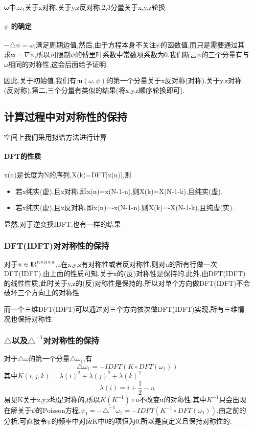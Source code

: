 \documentclass[UTF8]{ctexart}
\begin{document}
$\mathbf{\omega}$中,$\omega_1$关于x对称,关于y,z反对称,2,3分量关于x,y,z轮换

\paragraph{$\psi$ 的确定}
$-\triangle \psi = \omega$,满足周期边值,然后,由于方程本身不关注$\psi$的函数值,而只是需要通过其求$\mathbf{u}=\nabla \psi$,所以可限制$\psi$的傅里叶系数中常数项系数为0.我们断言$\psi$的三个分量有与$\omega$相同的对称性,这会后面给予证明.


因此,关于初始值,我们有:$\mathbf{u}(\omega,\psi)$的第一个分量关于x反对称(对称),关于y,z对称(反对称),第二,三个分量有类似的结果(将x,y,z顺序轮换即可).


\subsection{计算过程中对对称性的保持}
空间上我们采用拟谱方法进行计算
\paragraph{DFT的性质}
x(n)是长度为N的序列,X(k)=DFT[x(n)],则
\begin{itemize}
  \item 若x纯实(虚),且x对称,即x(n)=x(N-1-n),则X(k)=X(N-1-k),且纯实(虚).
  \item 若x纯实(虚),且x反对称,即x(n)=-x(N-1-n),则X(k)=-X(N-1-k),且纯虚(实).
\end{itemize}
显然,对于逆变换IDFT,也有一样的结果

\subsubsection{DFT(IDFT)对对称性的保持}
对于$u\in \rm{I\!R}^{n \times n \times n}$,u在x,y,z有对称性或者反对称性,则对u的所有行做一次DFT(IDFT),由上面的性质可知,关于x的(反)对称性是保持的,此外,由DFT(IDFT)的线性性质,此时关于y,z的(反)对称性是保持的.所以对单个方向做DFT(IDFT)不会破坏三个方向上的对称性

而一个三维DFT(IDFT)可以通过对三个方向依次做DFT(IDFT)实现,所有三维情况也保持对称性
\subsubsection{$\triangle$以及$\triangle^{-1}$对对称性的保持}
对于$\triangle \omega$的第一个分量$\triangle \omega_1$,有
$$
\triangle \omega_1 = -IDFT( K \circ DFT(\omega_1))
$$
其中$K(i,j,k)= \lambda(i)^2+\lambda(j)^2+\lambda(k)^2$
\begin{equation*}
  \lambda(i)= i+\frac{1}{2}-n
\end{equation*}
易见K关于x,y,z均是对称的,所以$K(K^{-1})\circ u$不改变u的对称性.其中$K^{-1}$只会出现在解关于$\psi$的Poisson方程,$\psi_1=-\triangle^{-1}\omega_1=-IDFT( K^{-1} \circ DFT(\omega_1))$,由之前的分析,可直接令$\psi$的频率中对应K中0的项恒为0,所以是良定义且保持对称性的.
\end{document}

